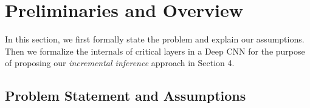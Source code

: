 \section{Preliminaries and Overview}\label{sec:preliminaries}
In this section, we first formally state the problem and explain our assumptions.
Then we formalize the internals of critical layers in a Deep CNN for the purpose of proposing our \textit{incremental inference} approach in Section 4.

\subsection{Problem Statement and Assumptions}\label{sec:problem}

